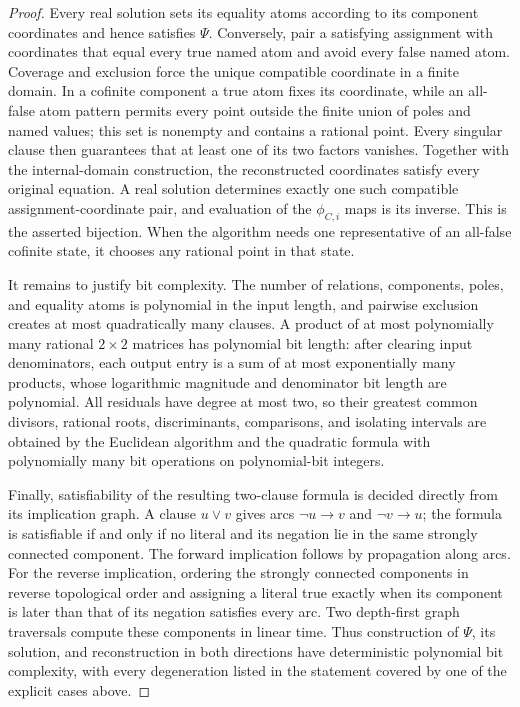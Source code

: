 \documentclass{article}
\begin{document}
\begin{proof}
Every real solution sets its equality atoms according to its component coordinates and hence satisfies \(\Psi\).  Conversely, pair a satisfying assignment with coordinates that equal every true named atom and avoid every false named atom.  Coverage and exclusion force the unique compatible coordinate in a finite domain.  In a cofinite component a true atom fixes its coordinate, while an all-false atom pattern permits every point outside the finite union of poles and named values; this set is nonempty and contains a rational point.  Every singular clause then guarantees that at least one of its two factors vanishes.  Together with the internal-domain construction, the reconstructed coordinates satisfy every original equation.  A real solution determines exactly one such compatible assignment-coordinate pair, and evaluation of the \(\phi_{C,i}\) maps is its inverse.  This is the asserted bijection.  When the algorithm needs one representative of an all-false cofinite state, it chooses any rational point in that state.

It remains to justify bit complexity.  The number of relations, components, poles, and equality atoms is polynomial in the input length, and pairwise exclusion creates at most quadratically many clauses.  A product of at most polynomially many rational \(2\times2\) matrices has polynomial bit length: after clearing input denominators, each output entry is a sum of at most exponentially many products, whose logarithmic magnitude and denominator bit length are polynomial.  All residuals have degree at most two, so their greatest common divisors, rational roots, discriminants, comparisons, and isolating intervals are obtained by the Euclidean algorithm and the quadratic formula with polynomially many bit operations on polynomial-bit integers.

Finally, satisfiability of the resulting two-clause formula is decided directly from its implication graph.  A clause \(u\lor v\) gives arcs \(\neg u\to v\) and \(\neg v\to u\); the formula is satisfiable if and only if no literal and its negation lie in the same strongly connected component.  The forward implication follows by propagation along arcs.  For the reverse implication, ordering the strongly connected components in reverse topological order and assigning a literal true exactly when its component is later than that of its negation satisfies every arc.  Two depth-first graph traversals compute these components in linear time.  Thus construction of \(\Psi\), its solution, and reconstruction in both directions have deterministic polynomial bit complexity, with every degeneration listed in the statement covered by one of the explicit cases above.
\end{proof}
\end{document}
